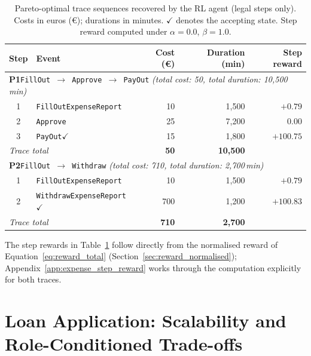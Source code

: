 \begin{table}[H]
\centering
\caption{Pareto-optimal trace sequences recovered by the \ac{RL} agent
         (legal steps only).
         Costs in euros (€); durations in minutes.
         $\checkmark$ denotes the accepting state.
         Step reward computed under $\alpha=0.0$, $\beta=1.0$.}
\label{tab:pareto_traces}
{\renewcommand{\arraystretch}{1.5}
\setlength{\tabcolsep}{6pt}
\begin{tabular}{c l r r r}
\toprule
\textbf{Step} & \textbf{Event} & \textbf{Cost (€)} &
\textbf{Duration (min)} & \textbf{Step reward} \\
\midrule
\multicolumn{5}{l}{\textbf{P1}\enspace \texttt{FillOut $\to$ Approve $\to$ PayOut}
  \quad\textit{(total cost: 50, total duration: 10{,}500\,min)}} \\
\midrule
1 & \texttt{FillOutExpenseReport} & 10  & 1{,}500 & $+0.79$ \\
2 & \texttt{Approve}              & 25  & 7{,}200 & $\phantom{+}0.00$ \\
3 & \texttt{PayOut}\;$\checkmark$ & 15  & 1{,}800 & $+100.75$ \\
\midrule
\multicolumn{2}{l}{\textit{Trace total}} &
  \textbf{50} & \textbf{10{,}500} & \\
\midrule
\multicolumn{5}{l}{\textbf{P2}\enspace \texttt{FillOut $\to$ Withdraw}
  \quad\textit{(total cost: 710, total duration: 2{,}700\,min)}} \\
\midrule
1 & \texttt{FillOutExpenseReport}                & 10  & 1{,}500 & $+0.79$ \\
2 & \texttt{WithdrawExpenseReport}\;$\checkmark$ & 700 & 1{,}200 & $+100.83$ \\
\midrule
\multicolumn{2}{l}{\textit{Trace total}} &
  \textbf{710} & \textbf{2{,}700} & \\
\bottomrule
\end{tabular}}
\end{table}

The step rewards in Table~\ref{tab:pareto_traces} follow directly from
the normalised reward of Equation~\ref{eq:reward_total}
(Section~\ref{sec:reward_normalised}); Appendix~\ref{app:expense_step_reward}
works through the computation explicitly for both traces.


\section{Loan Application: Scalability and Role-Conditioned Trade-offs}
\label{sec:results_loanapp}

